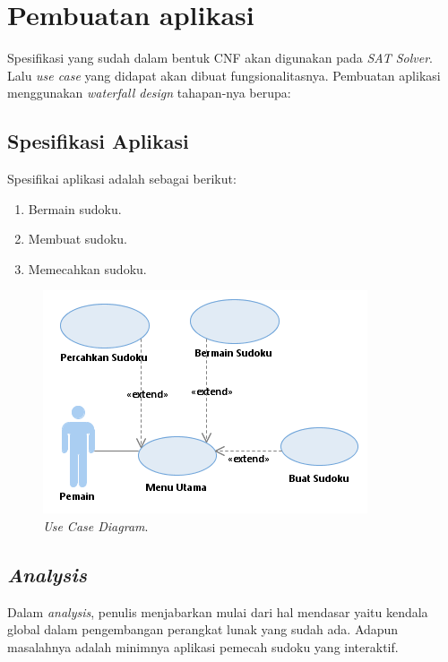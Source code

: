 \section{Pembuatan aplikasi}

Spesifikasi yang sudah dalam bentuk CNF akan digunakan pada \textit{SAT Solver}. Lalu \textit{use case} yang didapat akan dibuat fungsionalitasnya. Pembuatan aplikasi menggunakan \textit{waterfall design} tahapan-nya berupa:

\subsection{Spesifikasi Aplikasi}

Spesifikai aplikasi adalah sebagai berikut:
\begin{enumerate}
	\item Bermain sudoku.
	\item Membuat sudoku.
	\item Memecahkan sudoku.
\end{enumerate}

\begin{figure}[H]
	\begin{centering}
		\includegraphics[scale=1]{gambar/useCase}
		
		\caption{\textit{Use Case Diagram}.}
	\end{centering}
\end{figure}

\subsection{\textit{Analysis}}

Dalam \textit{analysis}, penulis menjabarkan mulai dari hal
mendasar yaitu kendala global dalam pengembangan perangkat lunak yang sudah ada. Adapun masalahnya adalah minimnya aplikasi pemecah sudoku yang interaktif.


